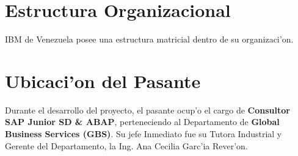 \section{Estructura Organizacional} \label{sect:organizacion}
	IBM de Venezuela posee una estructura matricial dentro de su organizaci'on.

\section{Ubicaci'on del Pasante}
	Durante el desarrollo del proyecto, el pasante ocup'o el cargo de \textbf{Consultor SAP Junior SD \& ABAP}, perteneciendo al Departamento de  \textbf{Global Business Services (GBS)}. Su jefe Inmediato fue su Tutora Industrial y Gerente del Departamento, la Ing. Ana Cecilia Garc'ia Rever'on. 